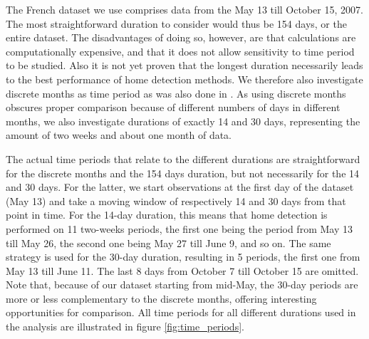 \documentclass[a4paper]{article}
\begin{document}
The French dataset we use comprises data from the May 13 till October 15, 2007. The most straightforward duration to consider would thus be 154 days, or the entire dataset. The disadvantages of doing so, however, are that calculations are computationally expensive, and that it does not allow sensitivity to time period to be studied. Also it is not yet proven that the longest duration necessarily leads to the best performance of home detection methods. We therefore also investigate discrete months as time period as was also done in \cite{Vanhoof_JOS}. As using discrete months obscures proper comparison because of different numbers of days in different months, we also investigate durations of exactly 14 and 30 days, representing the amount of two weeks and about one month of data. 


The actual time periods that relate to the different durations are straightforward for the discrete months and the 154 days duration, but not necessarily for the 14 and 30 days. For the latter, we start observations at the first day of the dataset (May 13) and take a moving window of respectively 14 and 30 days from that point in time. For the 14-day duration, this means that home detection is performed on 11 two-weeks periods, the first one being the period from May 13 till May 26, the second one being May 27 till June 9, and so on. The same strategy is used for the 30-day duration, resulting in 5 periods, the first one from May 13 till June 11. The last 8 days from October 7 till October 15 are omitted. Note that, because of our dataset starting from mid-May, the 30-day periods are more or less complementary to the discrete months, offering interesting opportunities for comparison. All time periods for all different durations used in the analysis are illustrated in figure \ref{fig:time_periods}. 
\end{document}
